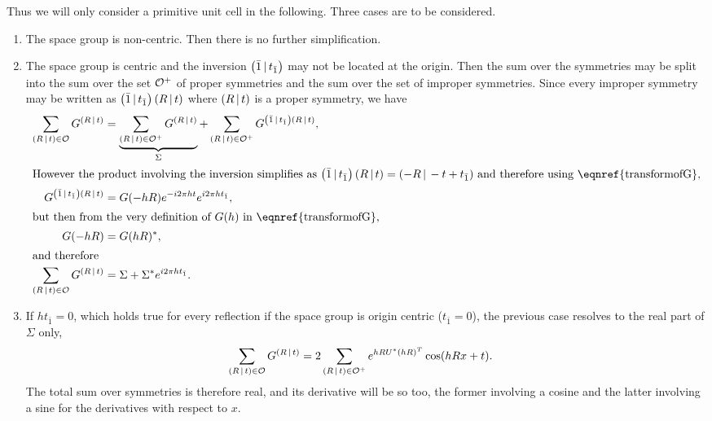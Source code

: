 \documentclass[pdf]{iucr}
\begin{document}
Thus we will only consider a primitive unit cell in the following. Three cases are to be considered.
\begin{enumerate}
\item The space group is non-centric. Then there is no further simplification.
\item The space group is centric and the inversion $\left( \bar{1}\,\vert\, t_{\bar{1}} \right)$ may not be located at the origin. Then the sum over the symmetries may be split into the sum over the set $\cal{O}^+$ of proper symmetries and the sum over the set of  improper symmetries. Since every improper symmetry may be written as $\left( \bar{1}\,\vert\, t_{\bar{1}} \right)\left( R\,\vert\, t \right)$ where $\left( R\,\vert\, t \right)$ is a proper symmetry, we have
\begin{align}
\sum_{\sym{R}{t} \in \cal{O}} G^{\sym{R}{t}} &= 
\underbrace{\sum_{\sym{R}{t} \in \cal{O^+}} G^{\sym{R}{t}} }_{\Sigma} 
+ \sum_{\sym{R}{t} \in \cal{O}^+} G^{\inversion \sym{R}{t}}, \nonumber \\
\intertext{However the product involving the inversion simplifies as 
$\inversion\sym{R}{t} = \sym{-R}{-t + t_{\bar{1}}}$ and therefore using \eqnref{transformofG},}
G^{\inversion\sym{R}{t}} &= G(-hR) e^{-i2\pi ht} e^{i2\pi h t_{\bar{1}}}, \nonumber \\
 \intertext{but then from the very definition of $G(h)$ in \eqnref{transformofG},}
 G(-hR) &= G(hR)^*, \\
 \intertext{and therefore}
 \sum_{\sym{R}{t} \in \cal{O}} G^{\sym{R}{t}} &= \Sigma + \Sigma^* e^{i2\pi h t_{\bar{1}}}.
 \label{eqn:sumofGforcentricgroups}
\end{align}

\item If $h t_{\bar{1}}=0$, which holds true for every reflection if the space group is origin centric ($t_{\bar{1}}=0$), the previous case resolves to the real part of $\Sigma$ only,
\begin{align}
 \sum_{\left( R\,\vert\, t \right) \in \cal{O}} G^{\left( R\,\vert\, t \right)} & = 2 \sum_{\left( R\,\vert\, t \right) \in \cal{O}^+}  e^{h R U^* (hR)^T} \cos(hRx + t).
\end{align}
The total sum over symmetries is therefore real, and its derivative will be so too, the former involving a cosine and the latter involving a sine for the derivatives with respect to $x$. 
\end{enumerate}
\end{document}
